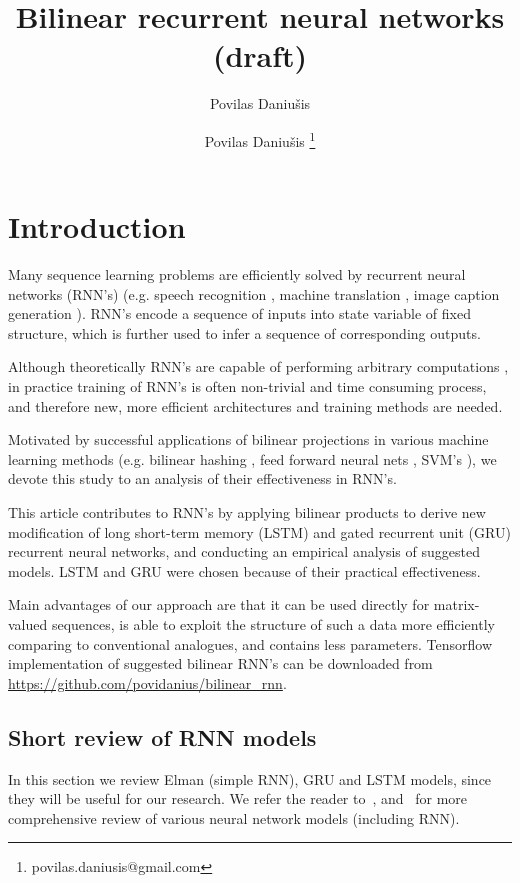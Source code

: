 \documentclass[a4paper,11pt]{article}
\author{Povilas Daniu\v{s}is}
\author[1]{Povilas Daniu\v{s}is \thanks{povilas.daniusis@gmail.com}}
\title{Bilinear recurrent neural networks (draft)}
\begin{document}
\maketitle
\section{Introduction}

Many sequence learning problems are efficiently solved by recurrent neural networks (RNN's) (e.g. speech recognition \cite{Sak}, machine translation \cite{Sutskever}, image caption generation \cite{Vinyals}). RNN's encode a sequence of inputs into state variable of fixed structure, which is further used to infer a sequence of corresponding outputs. 



Although theoretically RNN's are capable of performing arbitrary computations \cite{Siegelmann}, in practice training of RNN's is often non-trivial and time consuming process, and therefore new, more efficient architectures and training methods are needed.



Motivated by successful applications of bilinear projections in
various machine learning methods (e.g. bilinear hashing \cite{Gong}, feed forward neural nets \cite{Daniusis}, SVM's \cite{Cai}), we devote this study to an analysis of their effectiveness in RNN's.


This article contributes to RNN's by applying bilinear products to derive new modification of long short-term memory (LSTM) \cite{Hochreiter} and gated recurrent unit (GRU) \cite{Chung} recurrent neural networks, and conducting an empirical analysis of suggested models. LSTM and GRU were chosen because of their practical effectiveness.

Main advantages of our approach are that it can be used directly for matrix-valued sequences, is able to exploit the structure of such a data more efficiently comparing to conventional analogues, and contains less parameters. Tensorflow \cite{Tensorflow} implementation of suggested bilinear RNN's can be downloaded from \url{https://github.com/povidanius/bilinear_rnn}.




\subsection{Short review of RNN models}

In this section we review Elman (simple RNN), GRU and LSTM models, since they  will be useful for our research. We refer the reader to~\cite{Haykin}, and~\cite{Schmidhuber} for more comprehensive review of various neural network models (including RNN).
\end{document}
